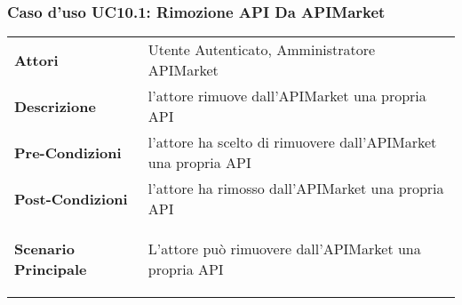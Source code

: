 \subsubsection{Caso d'uso UC10.1: Rimozione API Da APIMarket}
\label{UC10.1}

\renewcommand*{\arraystretch}{1.6}
\begin{longtable}{ l | p{11cm}}
	\hline
	\rowcolor{Gray}
	\multicolumn{2}{c}{UC10.1: Rimozione API Da APIMarket} \\
	\hline
	\textbf{Attori} &Utente Autenticato, Amministratore APIMarket \\
	\textbf{Descrizione} & l'attore rimuove dall'APIMarket una propria API\\
	\textbf{Pre-Condizioni} & l'attore ha scelto di rimuovere dall'APIMarket una propria API\\
	\textbf{Post-Condizioni}&l'attore ha rimosso dall'APIMarket una propria API\\
	\textbf{Scenario Principale} & \begin{enumerate*}[label=(\arabic*.),itemjoin={\newline}]
			\item L'attore può rimuovere dall'APIMarket una propria API
	\end{enumerate*}\\
\end{longtable}



